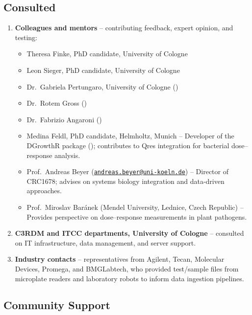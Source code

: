 \documentclass[
]{article}
\providecommand{\tightlist}{%
  \setlength{\itemsep}{0pt}\setlength{\parskip}{0pt}}
\begin{document}
\subsection{Consulted}\label{consulted}

\begin{enumerate}
\def\labelenumi{\arabic{enumi}.}
\item
  \textbf{Colleagues and mentors} -- contributing feedback, expert
  opinion, and testing:

  \begin{itemize}
  \tightlist
  \item
    Theresa Finke, PhD candidate, University of Cologne
  \item
    Leon Sieger, PhD candidate, University of Cologne
  \item
    Dr.~Gabriela Pertungaro, University of Cologne
    ()
  \item
    Dr.~Rotem Gross ()
  \item
    Dr.~Fabrizio Angaroni ()
  \item
    Medina Feldl, PhD candidate, Helmholtz, Munich -- Developer of the
    DGrowthR package (); contributes to Qres integration for bacterial dose--response
    analysis.
  \item
    Prof.~Andreas Beyer
    (\href{mailto:andreas.beyer@uni-koeln.de}{\nolinkurl{andreas.beyer@uni-koeln.de}})
    -- Director of CRC1678; advises on systems biology integration and
    data-driven approaches.
  \item
    Prof.~Miroslav Baránek (Mendel University, Lednice, Czech Republic)
    -- Provides perspective on dose--response measurements in plant
    pathogens.
  \end{itemize}
\item
  \textbf{C3RDM and ITCC departments, University of Cologne} --
  consulted on IT infrastructure, data management, and server support.
\item
  \textbf{Industry contacts} -- representatives from Agilent, Tecan,
  Molecular Devices, Promega, and BMGLabtech, who provided test/sample
  files from microplate readers and laboratory robots to inform data
  ingestion pipelines.
\end{enumerate}

\subsection{Community Support}\label{community-support}
\end{document}
